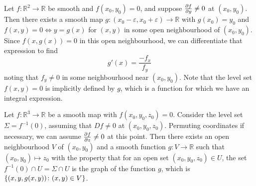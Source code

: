 \begin{example}
	Let \( f \colon \mathbb R^2 \to \mathbb R \) be smooth and \( f(x_0, y_0) = 0 \), and suppose \( \pdv{f}{y} \neq 0 \) at \( (x_0, y_0) \).
	Then there exists a smooth map \( g \colon (x_0 - \varepsilon, x_0 + \varepsilon) \to \mathbb R \) with \( g(x_0) = y_0 \) and \( f(x,y) = 0 \iff y = g(x) \) for \( (x,y) \) in some open neighbourhood of \( (x_0, y_0) \).
	Since \( f(x,g(x)) = 0 \) in this open neighbourhood, we can differentiate that expression to find
	\[ g'(x) = \frac{-f_x}{f_y} \]
	noting that \( f_y \neq 0 \) in some neighbourhood near \( (x_0, y_0) \).
	Note that the level set \( f(x,y) = 0 \) is implicitly defined by \( g \), which is a function for which we have an integral expression.
\end{example}
\begin{example}
	Let \( f \colon \mathbb R^3 \to \mathbb R \) be a smooth map with \( f(x_0, y_0, z_0) = 0 \).
	Consider the level set \( \Sigma = f^{-1}(0) \), assuming that \( Df \neq 0 \) at \( (x_0, y_0, z_0) \).
	Permuting coordinates if necessary, we can assume \( \pdv{f}{z} \neq 0 \) at this point.
	Then there exists an open neighbourhood \( V \) of \( (x_0, y_0) \) and a smooth function \( g \colon V \to \mathbb R \) such that \( (x_0, y_0) \mapsto z_0 \) with the property that for an open set \( (x_0, y_0, z_0) \in U \), the set \( f^{-1}(0) \cap U = \Sigma \cap U \) is the graph of the function \( g \), which is \( \qty{ (x,y,g(x,y)) \colon (x,y) \in V } \).
\end{example}

